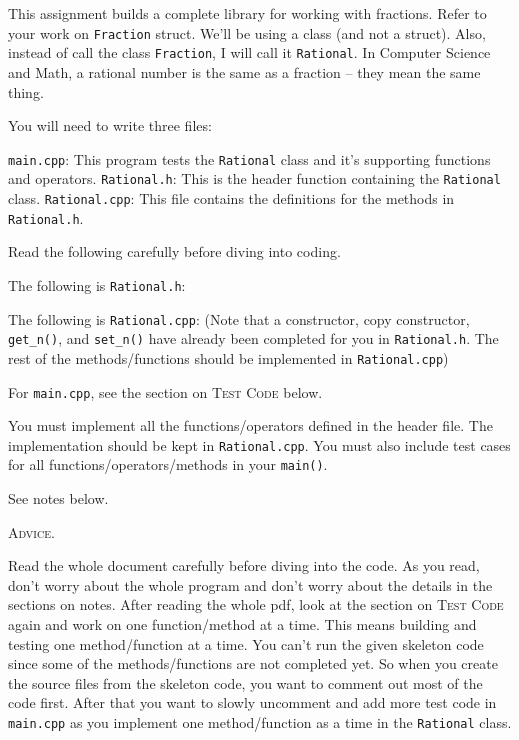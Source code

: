 This assignment builds a complete library for working with fractions.
Refer to your work on \verb!Fraction! struct.
We'll be using a class (and not a struct).
Also, instead of call the class \verb!Fraction!, I will call it
\verb!Rational!.
In Computer Science and Math, a rational number is the same as a fraction --
they mean the same thing.

You will need to write three files:
\begin{tightlist}
  \li \verb!main.cpp!: This program tests the
  \verb!Rational! class and it's supporting functions and operators. 
  \li \verb!Rational.h!: This is the header function containing the
  \verb!Rational! class.
  \li \verb!Rational.cpp!:
  This file contains the definitions for the methods in \verb!Rational.h!.
\end{tightlist}

Read the following carefully before diving into coding.

The following is \verb!Rational.h!:
{\small
{}
}

The following is \verb!Rational.cpp!:
{\small
{}
}
(Note that a constructor, copy constructor, \verb!get_n()!, and
\verb!set_n()! have already been completed for you in \texttt{Rational.h}.
The rest of the methods/functions should be implemented in
\texttt{Rational.cpp})

For \verb!main.cpp!, see the section on \textsc{Test Code} below.

You must implement all the functions/operators defined in the header file.
The implementation should be kept in \verb!Rational.cpp!.
You must also include test cases for all functions/operators/methods in your
\verb!main()!.

See notes below.




\newpage
\textsc{Advice}. 

Read the whole document carefully before diving into the code.
As you read, don't worry about the whole program and don't worry about the
details in the sections on notes.
After reading the whole pdf, look at the section on \textsc{Test Code}
again and work on one function/method at a time.
This means building and testing one
method/function at a time.
You can't run the given skeleton code since some of the methods/functions
are not completed yet.
So when you create the source files from the skeleton code, you
want to comment out most of the code first.
After that you want to slowly
uncomment and add more test code in \verb!main.cpp! as you implement one
method/function as a time 
in the \verb!Rational!
class.

